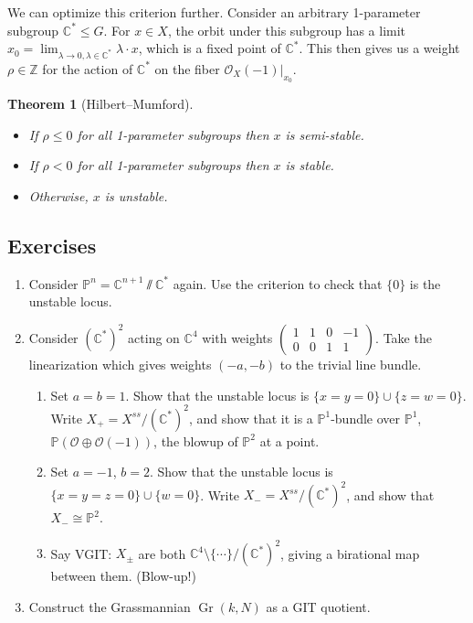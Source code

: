 \documentclass{article}
\newtheorem*{theorem}{Theorem}
\theoremstyle{definition}
\DeclareMathOperator{\Gr}{Gr}
\renewcommand{\O}{\mathcal{O}}
\renewcommand{\P}{\mathbb{P}}
\newcommand{\Z}{\mathbb{Z}}
\newcommand{\C}{\mathbb{C}}
\begin{document}
We can optimize this criterion further. Consider an arbitrary 1-parameter
subgroup $\C^*\le G$. For $x\in X$, the orbit under this subgroup has a limit
$x_0=\lim_{\lambda\to0,\lambda\in\C^*}\lambda\cdot x$, which is a
fixed point of $\C^*$. This then gives us a weight $\rho\in\Z$ for the action of
$\C^*$ on the fiber $\O_X(-1)|_{x_0}$.

\begin{theorem}[Hilbert--Mumford]
    \begin{itemize}
        \item  If $\rho\le0$ for all 1-parameter subgroups then $x$ is
            semi-stable.
        \item If $\rho<0$ for all 1-parameter subgroups then $x$ is stable.
        \item Otherwise, $x$ is unstable.
    \end{itemize}
\end{theorem}

\subsection*{Exercises}

\begin{enumerate}
    \item Consider $\P^n=\C^{n+1}\sslash\C^*$ again. Use the criterion to check
        that $\{0\}$ is the unstable locus.

    \item Consider $(\C^*)^2$ acting on $\C^4$ with weights $\begin{pmatrix}
            1 & 1 & 0 & -1 \\ 0 & 0 & 1 & 1
    \end{pmatrix}$. Take the linearization which gives weights $(-a,-b)$ to the
    trivial line bundle.
        \begin{enumerate}
            \item Set $a=b=1$. Show that the unstable locus is
                $\{x=y=0\}\cup\{z=w=0\}$. Write $X_+=X^{ss}/(\C^*)^2$, and show
                that it is a $\P^1$-bundle over $\P^1$, $\P(\O\oplus\O(-1))$,
                the blowup of $\P^2$ at a point.

            \item Set $a=-1$, $b=2$. Show that the unstable locus is
                $\{x=y=z=0\}\cup\{w=0\}$. Write $X_-=X^{ss}/(\C^*)^2$, and show
                that $X_-\cong\P^2$.

            \item Say VGIT: $X_\pm$ are both $\C^4\setminus\{\cdots\}/(\C^*)^2$,
                giving a birational map between them. (Blow-up!)
        \end{enumerate}

    \item Construct the Grassmannian $\Gr(k,N)$ as a GIT quotient.
\end{enumerate}
\end{document}

